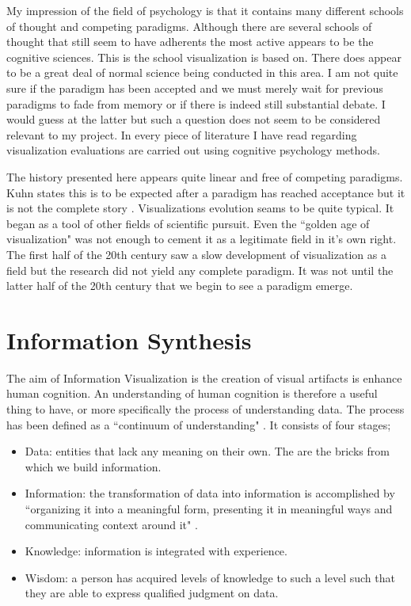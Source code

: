 \documentclass[a4paper, 10pt, titlepage, twocolumn, onehalfspace]{article}
\begin{document}
My impression of the field of psychology is that it contains many different schools of thought and competing paradigms. Although there are several schools of thought that still seem to have adherents the most active appears to be the cognitive sciences. This is the school visualization is based on. There does appear to be a great deal of normal science being conducted in this area. I am not quite sure if the paradigm has been accepted and we must merely wait for previous paradigms to fade from memory or if there is indeed still substantial debate. I would guess at the latter but such a question does not seem to be considered relevant to my project. In every piece of literature I have read regarding visualization evaluations are carried out using cognitive psychology methods.

The history presented here appears quite linear and free of competing paradigms. Kuhn states this is to be expected after a paradigm has reached acceptance but it is not the complete story \cite{kuhn1996structure}. Visualizations evolution seams to be quite typical. It began as a tool of other fields of scientific pursuit. Even the ``golden age of visualization" was not enough to cement it as a legitimate field in it's own right. The first half of the 20th century saw a slow development of visualization as a field but the research did not yield any complete paradigm. It was not until the latter half of the 20th century that we begin to see a paradigm emerge.

\section{Information Synthesis}
The aim of Information Visualization is the creation of visual artifacts is enhance human cognition. An understanding of human cognition is therefore a useful thing to have, or more specifically the process of understanding data. The process has been defined as a ``continuum of understanding" \cite{jacobson1999information}. It consists of four stages;
\begin{itemize}
\item Data: entities that lack any meaning on their own. The are the bricks from which we build information.
\item Information: the transformation of data into information is accomplished by ``organizing it into a meaningful form, presenting it in meaningful ways and communicating context around it" \cite{jacobson1999information}.
\item Knowledge: information is integrated with experience.
\item Wisdom: a person has acquired levels of knowledge to such a level such that they are able to express qualified judgment on data.
\end{itemize}
\end{document}
